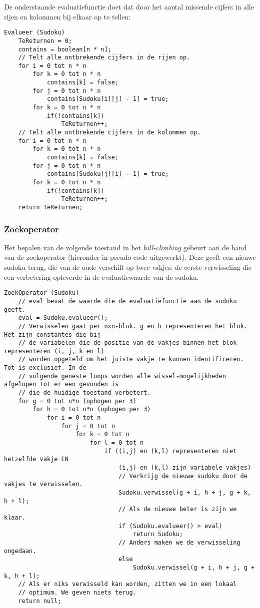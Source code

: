 \documentclass[]{report}
\begin{document}
De onderstaande evaluatiefunctie doet dat door het aantal missende cijfers in alle rijen en kolommen bij elkaar op te tellen:

\begin{minipage}{\textwidth}
\begin{lstlisting}
Evalueer (Sudoku)
	TeReturnen = 0;
	contains = boolean[n * n];
	// Telt alle ontbrekende cijfers in de rijen op.
	for i = 0 tot n * n
		for k = 0 tot n * n 
			contains[k] = false;
		for j = 0 tot n * n
			contains[Sudoku[i][j] - 1] = true;
		for k = 0 tot n * n
			if(!contains[k]) 
				TeReturnen++;
	// Telt alle ontbrekende cijfers in de kolommen op.
	for i = 0 tot n * n
		for k = 0 tot n * n
			contains[k] = false;
		for j = 0 tot n * n
			contains[Sudoku[j][i] - 1] = true;
		for k = 0 tot n * n
			if(!contains[k]) 
				TeReturnen++;
	return TeReturnen;
\end{lstlisting}
\end{minipage}

\subsubsection{Zoekoperator}
Het bepalen van de volgende toestand in het \textit{hill-climbing} gebeurt aan de hand van de zoekoperator (hieronder in pseudo-code uitgewerkt). Deze geeft een nieuwe sudoku terug, die van de oude verschilt op twee vakjes: de eerste verwisseling die een verbetering opleverde in de evaluatiewaarde van de sudoku.

\begin{minipage}{\textwidth}
\begin{lstlisting}
ZoekOperator (Sudoku)
	// eval bevat de waarde die de evaluatiefunctie aan de sudoku geeft.
	eval = Sudoku.evalueer();
	// Verwisselen gaat per nxn-blok. g en h representeren het blok. Het zijn constantes die bij 
	// de variabelen die de positie van de vakjes binnen het blok representeren (i, j, k en l) 
	// worden opgeteld om het juiste vakje te kunnen identificeren. Tot is exclusief. In de 
	// volgende geneste loops worden alle wissel-mogelijkheden afgelopen tot er een gevonden is 
	// die de huidige toestand verbetert.
	for g = 0 tot n*n (ophogen per 3) 
		for h = 0 tot n*n (ophogen per 3)
			for i = 0 tot n 
				for j = 0 tot n
					for k = 0 tot n
						for l = 0 tot n
							if ((i,j) en (k,l) representeren niet hetzelfde vakje EN
							    (i,j) en (k,l) zijn variabele vakjes)
								// Verkrijg de nieuwe sudoku door de vakjes te verwisselen.
								Sudoku.verwissel(g + i, h + j, g + k, h + l);
								// Als de nieuwe beter is zijn we klaar.
								if (Sudoku.evalueer() > eval) 
									return Sudoku;
								// Anders maken we de verwisseling ongedaan.
								else
									Sudoku.verwissel(g + i, h + j, g + k, h + l);
	// Als er niks verwisseld kan worden, zitten we in een lokaal
	// optimum. We geven niets terug.
	return null;
\end{lstlisting}
\end{minipage}
\end{document}
